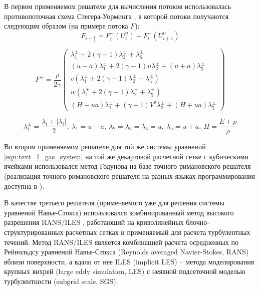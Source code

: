В первом применяемом решателе для вычисления потоков использовалась противопоточная схема Стегера-Уорминга \cite{Smirnova2018Euler}\label{term:steger_warming_scheme}, в которой потоки получаются следующим образом (на примере потока $F$):
\begin{equation}\label{eqn:text_1_gas_F}
	F_{i + \frac{1}{2}} = F_i^{+}(U_i^n) + F_i^{-}(U_{i + 1}^n)
\end{equation}

\begin{equation}\label{eqn:text_1_gas_F2}
	F^{\pm} = \frac{\rho}{2 \gamma}
	\begin{pmatrix}
		\lambda_1^{\pm} + 2(\gamma - 1)\lambda_2^{\pm} + \lambda_5^{\pm} \\
		(u - a)\lambda_1^{\pm} + 2(\gamma - 1)u\lambda_2^{\pm} + (u + a)\lambda_5^{\pm} \\
		v(\lambda_1^{\pm} + 2(\gamma - 1)\lambda_2^{\pm} + \lambda_5^{\pm}) \\
		w(\lambda_1^{\pm} + 2(\gamma - 1)\lambda_2^{\pm} + \lambda_5^{\pm}) \\
		(H - ua)\lambda_1^{\pm} + (\gamma - 1)V^2\lambda_2^{\pm} + (H + ua)\lambda_5^{\pm}
	\end{pmatrix}
\end{equation}

\begin{equation}
	\lambda_i^{\pm} = \frac{\lambda_i \pm |\lambda_i|}{2}, \ \lambda_1 = u - a, \ \lambda_2 = \lambda_3 = \lambda_4 = u, \ \lambda_5 = u + a, \ H = \frac{E + p}{\rho}
\end{equation}

Во втором применяемом решателе для той же системы уравнений \eqref{eqn:text_1_gas_system} на той же декартовой расчетной сетке с кубическими ячейками использовался метод Годунова \cite{Kulikovsky2001Gas}\label{term:godunov_method} на базе точного римановского решателя \cite{Borisov2018Riemann}\label{term:riemann_solver} (реализация точного римановского решателя на разных языках программирования доступна в \cite{Toro1999Riemann,riemannvecGithub}).

В качестве третьего решателя (применяемого уже для решения системы уравнений Навье-Стокса) использовался комбинированный метод высокого разрешения RANS/ILES \cite{Bendersky2014RANSILES}, работающий на криволинейных блочно-структурированных расчетных сетках и применяемый для расчета турбулентных течений.
Метод RANS/ILES является комбинацией расчета осредненных по Рейнольдсу уравнений Навье-Стокса (Reynolds averaged Navier-Stokes, RANS\label{abbr:rans}) вблизи поверхности, а вдали от нее ILES\label{abbr:iles} (implicit LES) -- метода моделирования крупных вихрей (large eddy simulation, LES\label{abbr:les}) с неявной подсеточной моделью турбулентности (subgrid scale, SGS\label{abbr:sgs}).

